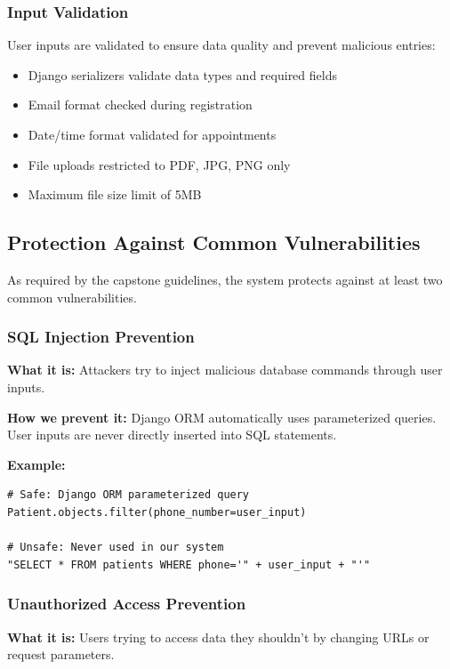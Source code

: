 \documentclass[11pt,a4paper]{article}
\begin{document}
\subsubsection{Input Validation}

User inputs are validated to ensure data quality and prevent malicious entries:
\begin{itemize}
    \item Django serializers validate data types and required fields
    \item Email format checked during registration
    \item Date/time format validated for appointments
    \item File uploads restricted to PDF, JPG, PNG only
    \item Maximum file size limit of 5MB
\end{itemize}

\subsection{Protection Against Common Vulnerabilities}

As required by the capstone guidelines, the system protects against at least two common vulnerabilities.

\subsubsection{SQL Injection Prevention}

\textbf{What it is:} Attackers try to inject malicious database commands through user inputs.

\noindent
\textbf{How we prevent it:} Django ORM automatically uses parameterized queries. User inputs are never directly inserted into SQL statements.

\noindent
\textbf{Example:}
\begin{verbatim}
# Safe: Django ORM parameterized query
Patient.objects.filter(phone_number=user_input)

# Unsafe: Never used in our system
"SELECT * FROM patients WHERE phone='" + user_input + "'"
\end{verbatim}

\subsubsection{Unauthorized Access Prevention}

\textbf{What it is:} Users trying to access data they shouldn't by changing URLs or request parameters.
\end{document}
